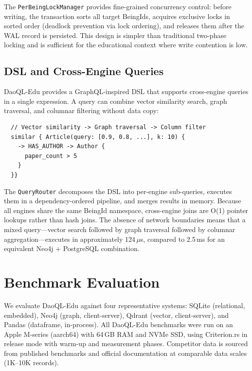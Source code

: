 \documentclass[11pt,a4paper]{article}
\begin{document}
The \texttt{PerBeingLockManager} provides fine-grained concurrency control:
before writing, the transaction sorts all target BeingIds, acquires
exclusive locks in sorted order (deadlock prevention via lock ordering), and
releases them after the WAL record is persisted. This design is simpler
than traditional two-phase locking and is sufficient for the educational
context where write contention is low.

\subsection{DSL and Cross-Engine Queries}

DaoQL-Edu provides a GraphQL-inspired DSL that supports cross-engine queries
in a single expression. A query can combine vector similarity search, graph
traversal, and columnar filtering without data copy:

\begin{verbatim}
  // Vector similarity -> Graph traversal -> Column filter
  similar { Article(query: [0.9, 0.8, ...], k: 10) {
    -> HAS_AUTHOR -> Author {
      paper_count > 5
    }
  }}
\end{verbatim}

The \texttt{QueryRouter} decomposes the DSL into per-engine sub-queries,
executes them in a dependency-ordered pipeline, and merges results in
memory. Because all engines share the same BeingId namespace, cross-engine
joins are O(1) pointer lookups rather than hash joins. The absence of
network boundaries means that a mixed query---vector search followed by
graph traversal followed by columnar aggregation---executes in approximately
124\,$\mu$s, compared to 2.5\,ms for an equivalent Neo4j + PostgreSQL
combination.

\section{Benchmark Evaluation}

We evaluate DaoQL-Edu against four representative systems: SQLite
(relational, embedded), Neo4j (graph, client-server), Qdrant (vector,
client-server), and Pandas (dataframe, in-process). All DaoQL-Edu benchmarks
were run on an Apple M-series (aarch64) with 64\,GB RAM and NVMe SSD, using
Criterion.rs in release mode with warm-up and measurement phases. Competitor
data is sourced from published benchmarks and official documentation at
comparable data scales (1K--10K records).
\end{document}
